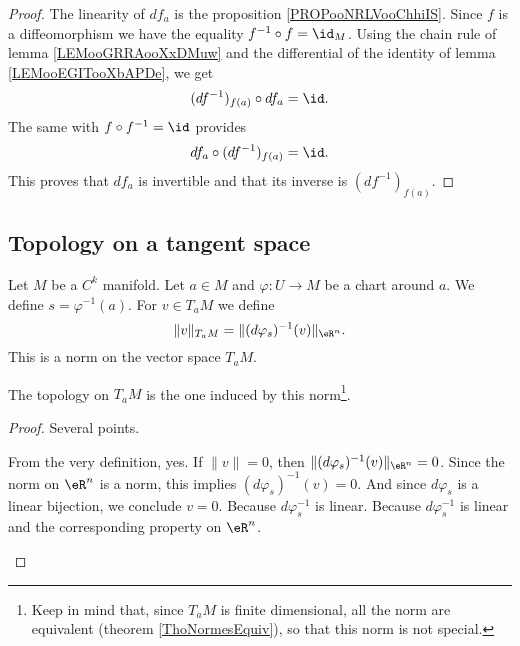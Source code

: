 \begin{proof}
	The linearity of \( df_a\) is the proposition \ref{PROPooNRLVooChhiIS}. Since \( f\) is a diffeomorphism we have the equality \( f^{-1}\circ f=\id_M\). Using the chain rule of lemma \ref{LEMooGRRAooXxDMuw} and the differential of the identity of lemma \ref{LEMooEGITooXbAPDe}, we get
	\begin{equation}
		(df^{-1})_{f(a)}\circ df_a=\id.
	\end{equation}
	The same with \( f\circ f^{-1}=\id\) provides
	\begin{equation}
		df_a\circ(df^{-1})_{f(a)}=\id.
	\end{equation}
	This proves that \( df_a\) is invertible and that its inverse is \( (df^{-1})_{f(a)}\).


\end{proof}

\subsection{Topology on a tangent space}

\begin{propositionDef}        \label{PROPooHJOXooMGANfd}
	Let \( M\) be a \( C^k\) manifold. Let \( a\in M\) and \( \varphi\colon U\to M\) be a chart around \( a\). We define \( s=\varphi^{-1}(a)\). For \( v\in T_aM\) we define
	\begin{equation}
		\| v \|_{T_aM}=\| (d\varphi_s)^{-1}(v) \|_{\eR^n}.
	\end{equation}
	This is a norm on the vector space \( T_aM\).

	The topology on \( T_aM\) is the one induced by this norm\footnote{Keep in mind that, since \( T_aM\) is finite dimensional, all the norm are equivalent (theorem \ref{ThoNormesEquiv}), so that this norm is not special.}.
\end{propositionDef}

\begin{proof}
	Several points.
	\begin{subproof}
		\spitem[\( \| v \|\geq 0\)]
		From the very definition, yes.
		\spitem[\( \| v \|=0\) si et seulement si \( v=0\)]
		If \( \| v \|=0\), then \( \| (d\varphi_s)^{-1}(v) \|_{\eR^n}=0\). Since the norm on \( \eR^n\) is a norm, this implies \( (d\varphi_s)^{-1}(v)=0\). And since \( d\varphi_s\) is a linear bijection, we conclude \( v=0\).
		\spitem[\( \| \lambda v \|=| \lambda |\| v \|\)]
		Because \( d\varphi_s^{-1}\) is linear.
		\spitem[\( \| v+w \|\leq \| v \|+\| v \|\)]
		Because \( d\varphi_s^{-1}\) is linear and the corresponding property on \( \eR^n\).
	\end{subproof}
\end{proof}

